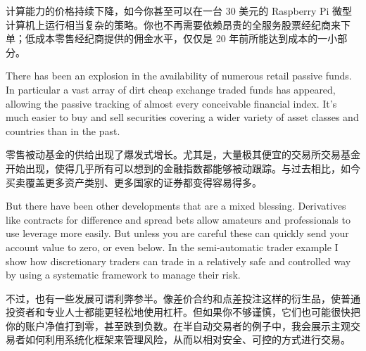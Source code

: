 \begin{chineseblock}计算能力的价格持续下降，如今你甚至可以在一台 30 美元的 Raspberry Pi 微型计算机上运行相当复杂的策略。你也不再需要依赖昂贵的全服务股票经纪商来下单；低成本零售经纪商提供的佣金水平，仅仅是 20 年前所能达到成本的一小部分。\end{chineseblock}

\bipairgap

\begin{englishblock} There has been an explosion in the availability of numerous retail passive funds. In particular a vast array of dirt cheap exchange traded funds has appeared, allowing the passive tracking of almost every conceivable financial index. It's much easier to buy and sell securities covering a wider variety of asset classes and countries than in the past. \end{englishblock}

\begin{chineseblock}零售被动基金的供给出现了爆发式增长。尤其是，大量极其便宜的交易所交易基金开始出现，使得几乎所有可以想到的金融指数都能够被动跟踪。与过去相比，如今买卖覆盖更多资产类别、更多国家的证券都变得容易得多。\end{chineseblock}

\bipairgap

\begin{englishblock} But there have been other developments that are a mixed blessing. Derivatives like contracts for difference and spread bets allow amateurs and professionals to use leverage more easily. But unless you are careful these can quickly send your account value to zero, or even below. In the semi-automatic trader example I show how discretionary traders can trade in a relatively safe and controlled way by using a systematic framework to manage their risk. \end{englishblock}

\begin{chineseblock}不过，也有一些发展可谓利弊参半。像差价合约和点差投注这样的衍生品，使普通投资者和专业人士都能更轻松地使用杠杆。但如果你不够谨慎，它们也可能很快把你的账户净值打到零，甚至跌到负数。在半自动交易者的例子中，我会展示主观交易者如何利用系统化框架来管理风险，从而以相对安全、可控的方式进行交易。\end{chineseblock}

\bipairgap

